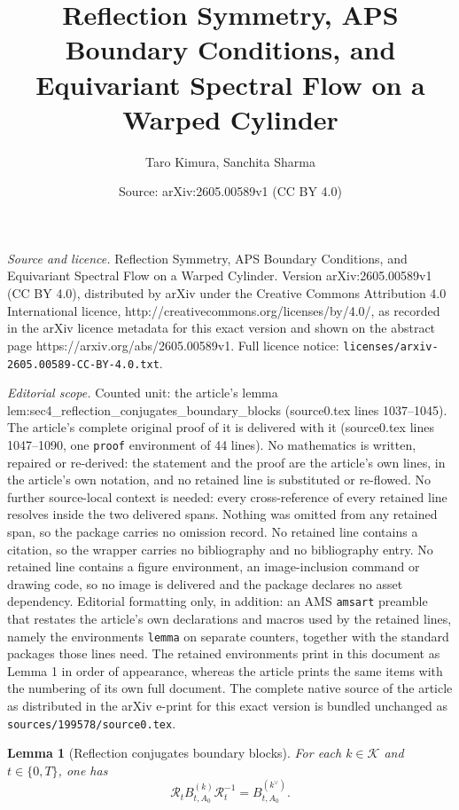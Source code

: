 \documentclass[10pt,a4paper]{amsart}
\title{Reflection Symmetry, APS Boundary Conditions, and Equivariant Spectral Flow on a Warped Cylinder}
\author{Taro Kimura, Sanchita Sharma}
\date{Source: arXiv:2605.00589v1 (CC BY 4.0)}
\newtheorem{lemma}{Lemma}
\begin{document}
\maketitle

\noindent\emph{Source and licence.} Reflection Symmetry, APS Boundary Conditions, and Equivariant Spectral Flow on a Warped Cylinder. Version arXiv:2605.00589v1 (CC BY 4.0), distributed by arXiv under the Creative Commons Attribution 4.0 International licence, http://creativecommons.org/licenses/by/4.0/, as recorded in the arXiv licence metadata for this exact version and shown on the abstract page https://arxiv.org/abs/2605.00589v1. Full licence notice: \texttt{licenses/arxiv-2605.00589-CC-BY-4.0.txt}.\par\smallskip

\noindent\textit{Editorial scope.} Counted unit: the article's lemma lem:sec4\_reflection\_conjugates\_boundary\_blocks (source0.tex lines 1037--1045). The article's complete original proof of it is delivered with it (source0.tex lines 1047--1090, one \texttt{proof} environment of 44 lines). No mathematics is written, repaired or re-derived: the statement and the proof are the article's own lines, in the article's own notation, and no retained line is substituted or re-flowed.  No further source-local context is needed: every cross-reference of every retained line resolves inside the two delivered spans.  Nothing was omitted from any retained span, so the package carries no omission record.  No retained line contains a citation, so the wrapper carries no bibliography and no bibliography entry.  No retained line contains a figure environment, an image-inclusion command or drawing code, so no image is delivered and the package declares no asset dependency.  Editorial formatting only, in addition: an AMS \texttt{amsart} preamble that restates the article's own declarations and macros used by the retained lines, namely the environments \texttt{lemma} on separate counters, together with the standard packages those lines need.  The retained environments print in this document as Lemma 1 in order of appearance, whereas the article prints the same items with the numbering of its own full document.  The complete native source of the article as distributed in the arXiv e-print for this exact version is bundled unchanged as \texttt{sources/199578/source0.tex}.
\begin{lemma}[Reflection conjugates boundary blocks]
\label{lem:sec4_reflection_conjugates_boundary_blocks}
For each \(k\in\mathcal K\) and \(t\in\{0,T\}\), one has
\begin{equation}
\mathcal R_t B^{(k)}_{t,A_0}\mathcal R_t^{-1}
=
B^{(k^\vee)}_{t,A_0}.
\end{equation}
\end{lemma}
\end{document}
